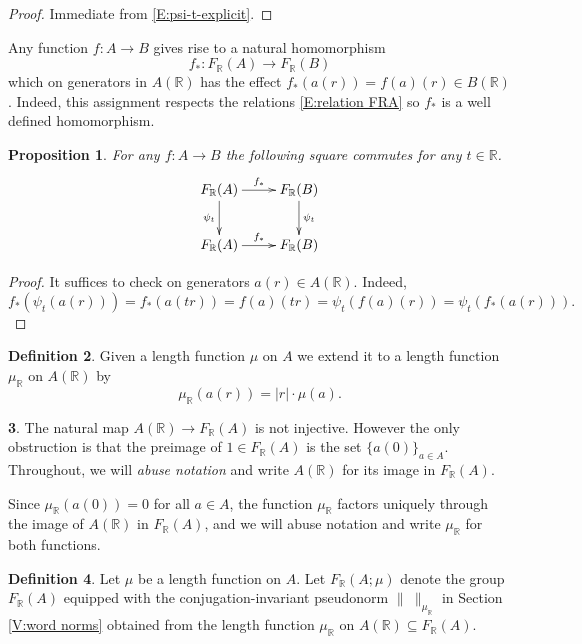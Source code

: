 \documentclass[12pt]{amsart}
\newtheorem{prop}{Proposition}[section]
\theoremstyle{definition}
\newtheorem{defn}[prop]{Definition}
\newtheorem{void}[prop]{}
\def\RR{\ensuremath{\mathbb{R}}}
\def\Free{F}
\begin{document}
\begin{proof}
Immediate from \eqref{E:psi-t-explicit}.
\end{proof}


Any function $f \colon A \to B$ gives rise to a natural homomorphism 
\[
f_* \colon \Free_\RR(A) \to \Free_\RR(B)
\]
which on generators in $A(\RR)$ has the effect $f_*(a(r))=f(a)(r) \in B(\RR)$.
Indeed, this assignment respects the relations \eqref{E:relation FRA} so $f_*$ is a well defined homomorphism.



\begin{prop}\label{P:psit commutes with fstar}
For any $f \colon A \to B$  the following square commutes for any $t \in \RR$.
\[
\xymatrix{
\Free_\RR(A) \ar[r]^{f_*} \ar[d]_{\psi_t} &
\Free_\RR(B) \ar[d]^{\psi_t} 
\\
\Free_\RR(A) \ar[r]^{f_*} &
\Free_\RR(B)  
}
\]
\end{prop}

\begin{proof}
It suffices to check on generators $a(r) \in A(\RR)$.
Indeed, 
\[
f_*(\psi_t(a(r))) = f_*(a(tr))=f(a)(tr) =\psi_t(f(a)(r)) = \psi_t(f_*(a(r))).
\]
\end{proof}







\begin{defn}\label{D:muRR}
Given a length function $\mu$ on $A$ we extend it to a length function $\mu_\RR$ on $A(\RR)$ by
\[
\mu_\RR(a(r)) = |r| \cdot \mu(a).
\]
\end{defn}



\begin{void}
The natural map $A(\RR) \to \Free_\RR(A)$ is not injective.
However the only obstruction is that the preimage of $1 \in \Free_\RR(A)$ is the set $\{a(0)\}_{a \in A}$.
Throughout, we will {\em abuse notation} and write $A(\RR)$ for its image in $\Free_\RR(A)$.

Since $\mu_\RR(a(0))=0$ for all $a \in A$, the function $\mu_\RR$ factors uniquely through the image of $A(\RR)$ in $\Free_\RR(A)$, and we will abuse notation and write $\mu_\RR$ for both functions.
\end{void}




\begin{defn}\label{D:FRAmu}
Let $\mu$ be a length function on $A$.
Let $\Free_\RR(A;\mu)$ denote the group $\Free_\RR(A)$ equipped with the conjugation-invariant pseudonorm $\| \ \|_{\mu_{\RR}}$ in Section \ref{V:word norms} obtained from the length function $\mu_\RR$ on $A(\RR) \subseteq \Free_\RR(A)$.
\end{defn}
\end{document}
